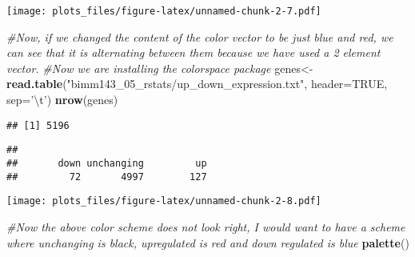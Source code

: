 \documentclass[]{article}
\newenvironment{Shaded}{\begin{snugshade}}{\end{snugshade}}
\newcommand{\KeywordTok}[1]{\textcolor[rgb]{0.13,0.29,0.53}{\textbf{#1}}}
\newcommand{\DataTypeTok}[1]{\textcolor[rgb]{0.13,0.29,0.53}{#1}}
\newcommand{\CharTok}[1]{\textcolor[rgb]{0.31,0.60,0.02}{#1}}
\newcommand{\StringTok}[1]{\textcolor[rgb]{0.31,0.60,0.02}{#1}}
\newcommand{\CommentTok}[1]{\textcolor[rgb]{0.56,0.35,0.01}{\textit{#1}}}
\newcommand{\OtherTok}[1]{\textcolor[rgb]{0.56,0.35,0.01}{#1}}
\newcommand{\OperatorTok}[1]{\textcolor[rgb]{0.81,0.36,0.00}{\textbf{#1}}}
\newcommand{\NormalTok}[1]{#1}
\begin{document}
\texttt{[image: plots\_files/figure-latex/unnamed-chunk-2-7.pdf]}

\begin{Shaded}
\begin{Highlighting}[]
\CommentTok{#Now, if we changed the content of the color vector to be just blue and red, we can see that it is alternating between them because we have used a 2 element vector. }
\CommentTok{#Now we are installing the colorspace package}
\NormalTok{genes<-}\StringTok{ }\KeywordTok{read.table}\NormalTok{(}\StringTok{"bimm143_05_rstats/up_down_expression.txt"}\NormalTok{, }\DataTypeTok{header=}\OtherTok{TRUE}\NormalTok{, }\DataTypeTok{sep=}\StringTok{'}\CharTok{\textbackslash{}t}\StringTok{'}\NormalTok{)}
\KeywordTok{nrow}\NormalTok{(genes)}
\end{Highlighting}
\end{Shaded}

\begin{verbatim}
## [1] 5196
\end{verbatim}

\begin{Shaded}
\end{Shaded}

\begin{verbatim}
## 
##       down unchanging         up 
##         72       4997        127
\end{verbatim}

\begin{Shaded}
\end{Shaded}

\texttt{[image: plots\_files/figure-latex/unnamed-chunk-2-8.pdf]}

\begin{Shaded}
\begin{Highlighting}[]
\CommentTok{#Now the above color scheme does not look right, I would want to have a scheme where unchanging is black, upregulated is red and down regulated is blue}
\KeywordTok{palette}\NormalTok{()}
\end{Highlighting}
\end{Shaded}
\end{document}

